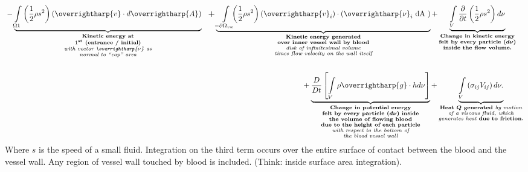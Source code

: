 \documentclass[12pt, a4paper]{article}
\theoremstyle{definition}
\theoremstyle{remark}
\theoremstyle{definition}
\newcommand*{\vtr}[1]{\text{\overrightharp{\ensuremath{#1}}}}
\newcommand{\?}{\stackrel{?}{=}}
\renewcommand{\bf}[1]{\textbf{#1}}
\renewcommand{\it}[1]{\textit{#1}}
\begin{document}
\begin{align}
\begin{multlined}
{{	}
}
- \underbrace{
\int\limits_{\Omega 1}  
\left(          
	\frac{1}{2}      \rho       {s}^{2}  
\right)     
	\left(      \vtr{v}   \cdot     d\vtr{A}      
\right)
}
_{\substack{
	\bf{Kinetic energy at} \\ \bf{${1}^{\text{st}}$ (entrance / initial)} \\  \it{with vector $\vtr{\nu}$ as} \\ \it{normal to ``cap'' area}
	}
}
\hspace{0.1in}
\boldsymbol{+}
\underbrace{
\int\limits_{-{\partial \Omega}_{vw}} \!\!\!\! 
\left( 
\frac{1}{2}\rho{s}^{2} 
\right) 
\left(
{\vtr{v}}_{i}
\right)
\cdot 
\left( {\vtr{\nu}}_{i} \text{ dA } 
\right)
}
_{\substack{
	\bf{Kinetic energy generated} \\ \bf{over inner vessel wall by blood} \\ \it{disk of infinitesimal volume} \\ \it{times flow velocity on the wall itself}
	}
}
+ 
\underbrace{
\int\limits_{V} \frac{\partial}{\partial t} \left(\frac{1}{2} \rho {s}^{2} \right) d\nu}
_{\substack{
	\bf{Change in kinetic energy} \\ \bf{felt by every particle ($\boldsymbol{d\nu}$)} \\  \bf{inside the flow volume.}
	}
}
\\ \\
+
\underbrace{
\frac{D}{Dt}
\left[ \int\limits_{V} \rho \vtr{g}\cdot h d\nu
\right]
}
_{\substack{
	\bf{Change in potential energy} \\ \bf{felt by every particle ($\boldsymbol{d\nu}$) inside} \\  \bf{the volume of flowing blood} \\ \bf{due to the height of each particle} \\ \it{with respect to the bottom of} \\ \it{the blood vessel wall}}
}
+
\underbrace{
\int\limits_{V} \left( {\sigma}_{ij}{V}_{ij} \right) d\nu.
}
_{\substack{
	\bf{Heat $\boldsymbol{Q}$ generated } \it{by motion} \\ \it{of a viscous fluid, which} \\  \it{generates heat } \bf{due to friction.}}
}
\end{multlined}
\end{align}
\newpage
\noindent Where $s$ is the speed of a small fluid.
Integration on the third term occurs over the entire surface of contact between the blood and the vessel wall. Any region of vessel wall touched by blood is included. (Think: inside surface area integration).\\ \\
\end{document}
